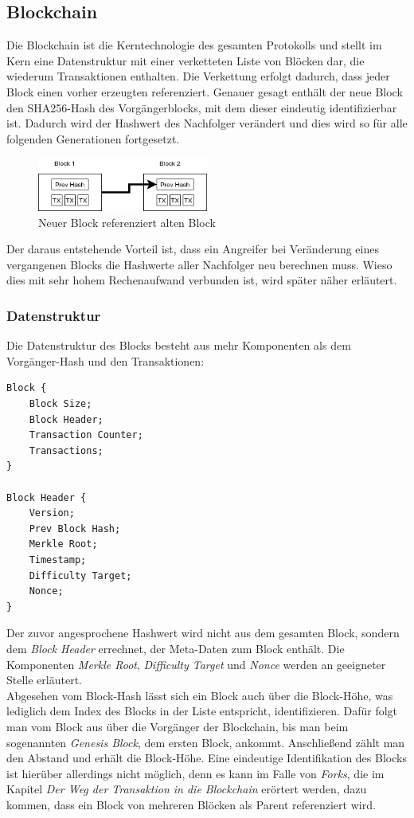\subsection{Blockchain}
Die Blockchain ist die Kerntechnologie des gesamten Protokolls und stellt im Kern eine Datenstruktur mit einer verketteten Liste von Blöcken dar, die wiederum Transaktionen enthalten. 
Die Verkettung erfolgt dadurch, dass jeder Block einen vorher erzeugten referenziert. 
Genauer gesagt enthält der neue Block den SHA256-Hash des Vorgängerblocks, mit dem dieser eindeutig identifizierbar ist. Dadurch wird der Hashwert des Nachfolger verändert und dies wird so für alle folgenden Generationen fortgesetzt.
\begin{figure}[htpb]
	\centering
	\includegraphics[width=0.5\textwidth]{images/chain.png}
	\caption{Neuer Block referenziert alten Block}
	\label{6braun:fig:chain}
\end{figure}
Der daraus entstehende Vorteil ist, dass ein Angreifer bei Veränderung eines vergangenen Blocks die Hashwerte aller Nachfolger neu berechnen muss. Wieso dies mit sehr hohem Rechenaufwand verbunden ist, wird später näher erläutert.

\subsubsection{Datenstruktur}
Die Datenstruktur des Blocks besteht aus mehr Komponenten als dem Vorgänger-Hash und den Transaktionen:
\begin{lstlisting}[mathescape, caption={Datenstruktur des Blocks},captionpos=b]
Block {
	Block Size;
	Block Header;
	Transaction Counter;
	Transactions;
}

Block Header {
	Version;
	Prev Block Hash;
	Merkle Root;
	Timestamp;
	Difficulty Target;
	Nonce;
}
\end{lstlisting}
Der zuvor angesprochene Hashwert wird nicht aus dem gesamten Block, sondern dem \emph{Block Header} errechnet, der Meta-Daten zum Block enthält. Die Komponenten \emph{Merkle Root}, \emph{Difficulty Target} und \emph{Nonce} werden an geeigneter Stelle erläutert.\\

Abgesehen vom Block-Hash lässt sich ein Block auch über die Block-Höhe, was lediglich dem Index des Blocks in der Liste entspricht, identifizieren. 
Dafür folgt man vom Block aus über die Vorgänger der Blockchain, bis man beim sogenannten \emph{Genesis Block}, dem ersten Block, ankommt. 
Anschließend zählt man den Abstand und erhält die Block-Höhe.
Eine eindeutige Identifikation des Blocks ist hierüber allerdings nicht möglich, denn es kann im Falle von \emph{Forks}, die im Kapitel \emph{Der Weg der Transaktion in die Blockchain} erörtert werden, dazu kommen, dass ein Block von mehreren Blöcken als Parent referenziert wird.\\
